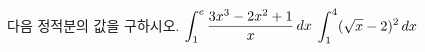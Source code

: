 다음 정적분의 값을 구하시오.
 $\displaystyle\int_{1}^{e}\dfrac{3x^3-2x^2+1}{x}\mkern3mu dx$
 $\displaystyle\int_{1}^{4}(\sqrt{x}-2)^2\mkern3mu dx$
